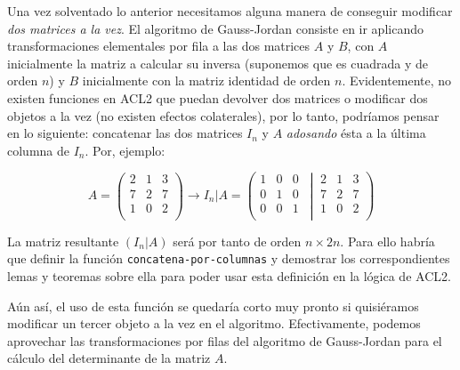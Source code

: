 \documentclass[a4paper,10pt]{article}
\begin{document}
\par \vspace{10pt}

Una vez solventado lo anterior necesitamos alguna manera de conseguir modificar \emph{dos matrices a la vez}. El algoritmo de Gauss-Jordan consiste en ir aplicando transformaciones elementales por fila a las dos matrices $A$ y $B$, con $A$ inicialmente la matriz a calcular su inversa (suponemos que es cuadrada y de orden $n$) y $B$ inicialmente con la matriz identidad de orden $n$. Evidentemente, no existen funciones en ACL2 que puedan devolver dos matrices o modificar dos objetos a la vez (no existen efectos colaterales), por lo tanto, podríamos pensar en lo siguiente: concatenar las dos matrices $I_n$ y $A$ \emph{adosando} ésta a la última columna de $I_n$. Por, ejemplo:

\par \vspace{10pt}

$$
A=
\begin{pmatrix}
2 & 1 & 3 \\
7 & 2 & 7 \\
1 & 0 & 2 \\ 
\end{pmatrix} \longrightarrow 
I_n|A = 
\left(
\left.
\begin{matrix}
1 & 0 & 0 \\
0 & 1 & 0 \\
0 & 0 & 1 \\ 
\end{matrix}
\ \  
\right|
\  
\begin{matrix}
2 & 1 & 3 \\
7 & 2 & 7 \\
1 & 0 & 2 \\ 
\end{matrix}
\right)
$$ 

\par \vspace{10pt}

La matriz resultante $(I_n|A)$ será por tanto de orden $n \times 2n$. Para ello habría que definir la función \texttt{concatena-por-columnas} y demostrar los correspondientes lemas y teoremas sobre ella para poder usar esta definición en la lógica de ACL2. 

\par \vspace{10pt}

Aún así, el uso de esta función se quedaría corto muy pronto si quisiéramos modificar un tercer objeto a la vez en el algoritmo. Efectivamente, podemos aprovechar las transformaciones por filas del algoritmo de Gauss-Jordan para el cálculo del determinante de la matriz $A$.
\end{document}
